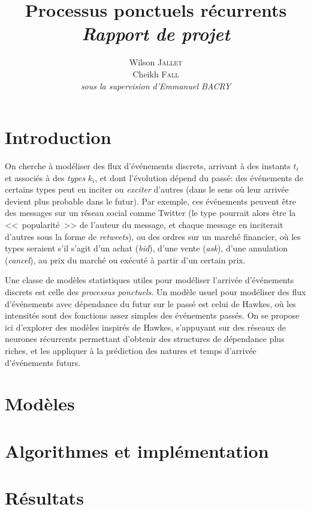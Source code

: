\documentclass[11pt]{article}
\title{\textbf{Processus ponctuels récurrents}\\
	\textit{Rapport de projet}  
}
\author{
  Wilson \textsc{Jallet}\\
  Cheikh \textsc{Fall}\\
  \textit{sous la supervision d'Emmanuel BACRY}
}
\begin{document}
\maketitle

\section{Introduction}

On cherche à modéliser des flux d'événements discrets, arrivant à des instants $t_i$ et associés à des \textit{types} $k_i$, et dont l'évolution dépend du passé: des événements de certains types peut en inciter ou \textit{exciter} d'autres (dans le sens où leur arrivée devient plus probable dans le futur). Par exemple, ces événements peuvent être des messages sur un réseau social comme Twitter (le type pourrait alors être la <<~popularité~>> de l'auteur du message, et chaque message en inciterait d'autres sous la forme de \textit{retweets}), ou des ordres sur un marché financier, où les types seraient s'il s'agit d'un achat (\textit{bid}), d'une vente (\textit{ask}), d'une annulation (\textit{cancel}), au prix du marché ou exécuté à partir d'un certain prix.

Une classe de modèles statistiques utiles pour modéliser l'arrivée d'événements discrets est celle des \textit{processus ponctuels}. Un modèle usuel pour modéliser des flux d'événements avec dépendance du futur sur le passé est celui de Hawkes, où les intensités sont des fonctions assez simples des événements passés. On se propose ici d'explorer des modèles inspirés de Hawkes, s'appuyant sur des réseaux de neurones récurrents permettant d'obtenir des structures de dépendance plus riches, et les appliquer à la prédiction des natures et temps d'arrivée d'événements futurs.

\section{Modèles}




\section{Algorithmes et implémentation}



\section{Résultats}
\end{document}
